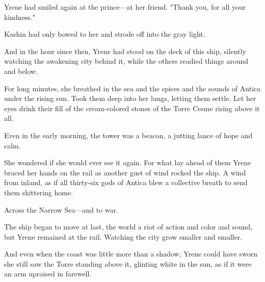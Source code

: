 Yrene had smiled again at the prince---at her friend.
"Thank you, for all your kindness."

Kashin had only bowed to her and strode off into the gray light.

And in the hour since then, Yrene had stood on the deck of this ship, silently watching the awakening city behind it, while the others readied things around and below.

For long minutes, she breathed in the sea and the spices and the sounds of Antica under the rising sun.
Took them deep into her lungs, letting them settle.
Let her eyes drink their fill of the cream-colored stones of the Torre Cesme rising above it all.

Even in the early morning, the tower was a beacon, a jutting lance of hope and calm.

She wondered if she would ever see it again.
For what lay ahead of them 
Yrene braced her hands on the rail as another gust of wind rocked the ship.
A wind from inland, as if all thirty-six gods of Antica blew a collective breath to send them skittering home.

Across the Narrow Sea---and to war.

The ship began to move at last, the world a riot of action and color and sound, but Yrene remained at the rail.
Watching the city grow smaller and smaller.

And even when the coast was little more than a shadow, Yrene could have sworn she still saw the Torre standing above it, glinting white in the sun, as if it were an arm upraised in farewell.

